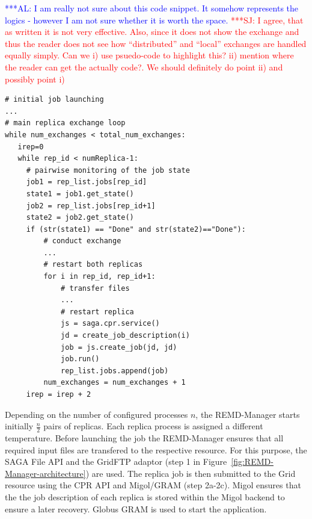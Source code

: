 \documentclass[times, 10pt, twocolumn]{article}
\newcommand{\alnote}[1]{ {\textcolor{blue} { ***AL: #1 }}}
\newcommand{\jhanote}[1]{ {\textcolor{red} { ***SJ: #1 }}}
\newcommand{\alnote}[1]{}
\newcommand{\jhanote}[1]{}
\begin{document}
\alnote{I am really not sure about this code snippet. It somehow
  represents the logics - however I am not sure whether it is worth
  the space.} \jhanote{I agree, that as written it is not very
  effective. Also, since it does not show the exchange and thus the
  reader does not see how ``distributed'' and ``local'' exchanges are
  handled equally simply. Can we i) use psuedo-code to highlight this?
  ii) mention where the reader can get the actually code?. We should
  definitely do point ii) and possibly point i)}
\begin{lstlisting}[style=myPythonListing, float=t, caption={\small \bf
REMD-Manager: Replica Orchestration},
label={lst:python_saga_chkpt_reg}]
# initial job launching       
...
# main replica exchange loop                    
while num_exchanges < total_num_exchanges: 
   irep=0
   while rep_id < numReplica-1:
     # pairwise monitoring of the job state
     job1 = rep_list.jobs[rep_id]
     state1 = job1.get_state()
     job2 = rep_list.jobs[rep_id+1]
     state2 = job2.get_state()
     if (str(state1) == "Done" and str(state2)=="Done"):
         # conduct exchange
         ...
         # restart both replicas  
         for i in rep_id, rep_id+1:
             # transfer files
             ...
             # restart replica
             js = saga.cpr.service()
             jd = create_job_description(i)    
             job = js.create_job(jd, jd)
             job.run()
             rep_list.jobs.append(job)
         num_exchanges = num_exchanges + 1
     irep = irep + 2
\end{lstlisting}



Depending on the number of configured processes $n$, the REMD-Manager
starts initially $\frac{n}{2}$ pairs of replicas.  Each replica
process is assigned a different temperature. Before launching the job
the REMD-Manager ensures that all required input files are transfered
to the respective resource. For this purpose, the SAGA File API and
the GridFTP adaptor (step 1 in
Figure~\ref{fig:REMD-Manager-architecture}) are used.  The replica job
is then submitted to the Grid resource using the CPR API and
Migol/GRAM (step 2a-2c). Migol ensures that the the job description of
each replica is stored within the Migol backend to ensure a later
recovery. Globus GRAM is used to start the application.
                                               
\end{document}
